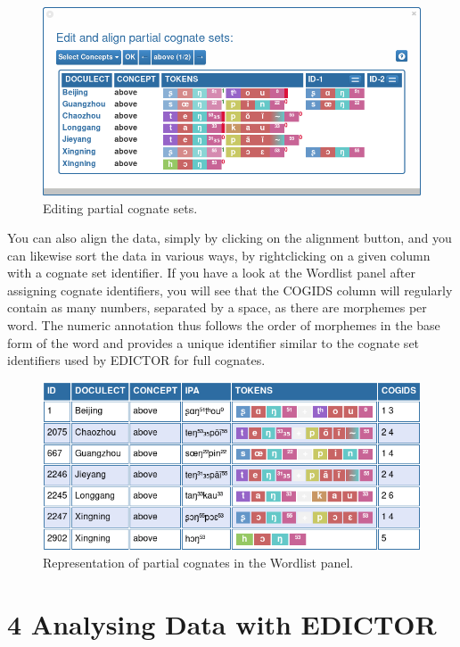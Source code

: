 \documentclass[a4paper,svgnames]{scrartcl}
\begin{document}
\begin{figure}
\centering
\includegraphics{images/figure-13.png}
\caption{Editing partial cognate sets.}
\end{figure}

You can also align the data, simply by clicking on the alignment button,
and you can likewise sort the data in various ways, by rightclicking on
a given column with a cognate set identifier. If you have a look at the
Wordlist panel after assigning cognate identifiers, you will see that
the COGIDS column will regularly contain as many numbers, separated by a
space, as there are morphemes per word. The numeric annotation thus
follows the order of morphemes in the base form of the word and provides
a unique identifier similar to the cognate set identifiers used by
EDICTOR for full cognates.

\begin{figure}
\centering
\includegraphics{images/figure-14.png}
\caption{Representation of partial cognates in the Wordlist
panel.}
\end{figure}

\section*{4 Analysing Data with
EDICTOR}\label{analysing-data-with-edictor}
\end{document}
